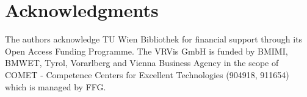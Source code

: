 \documentclass[]{interact}
\theoremstyle{plain}%
\theoremstyle{definition}
\theoremstyle{remark}
\begin{document}




\section*{Acknowledgments}
The authors acknowledge TU Wien Bibliothek for financial support through its Open Access Funding Programme. The VRVis GmbH is funded by BMIMI, BMWET, Tyrol, Vorarlberg and Vienna Business Agency in the scope of COMET - Competence Centers for Excellent Technologies (904918, 911654) which is managed by FFG.

% 
% 


\end{document}
